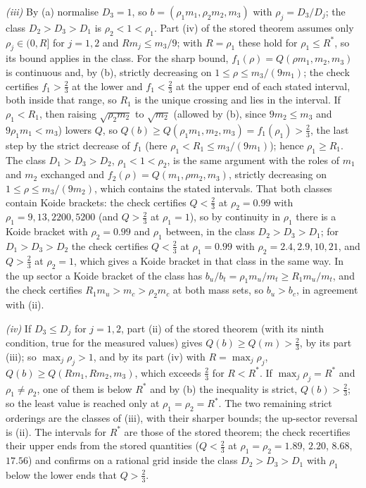 \emph{(iii)} By (a) normalise $D_{3} = 1$, so $b = (\rho_{1}m_{1}, \rho_{2}m_{2}, m_{3})$ with $\rho_{j} = D_{3}/D_{j}$; the class $D_{2} > D_{3} > D_{1}$ is $\rho_{2} < 1 < \rho_{1}$. Part (iv) of the stored theorem assumes only $\rho_{j} \in (0, R]$ for $j = 1, 2$ and $Rm_{j} \le m_{3}/9$; with $R = \rho_{1}$ these hold for $\rho_{1} \le R^{*}$, so its bound applies in the class. For the sharp bound, $f_{1}(\rho) = Q(\rho m_{1}, m_{2}, m_{3})$ is continuous and, by (b), strictly decreasing on $1 \le \rho \le m_{3}/(9m_{1})$; the check certifies $f_{1} > \tfrac23$ at the lower and $f_{1} < \tfrac23$ at the upper end of each stated interval, both inside that range, so $R_{1}$ is the unique crossing and lies in the interval. If $\rho_{1} < R_{1}$, then raising $\sqrt{\rho_{2}m_{2}}$ to $\sqrt{m_{2}}$ (allowed by (b), since $9m_{2} \le m_{3}$ and $9\rho_{1}m_{1} < m_{3}$) lowers $Q$, so $Q(b) \ge Q(\rho_{1}m_{1}, m_{2}, m_{3}) = f_{1}(\rho_{1}) > \tfrac23$, the last step by the strict decrease of $f_{1}$ (here $\rho_{1} < R_{1} \le m_{3}/(9m_{1})$); hence $\rho_{1} \ge R_{1}$. The class $D_{1} > D_{3} > D_{2}$, $\rho_{1} < 1 < \rho_{2}$, is the same argument with the roles of $m_{1}$ and $m_{2}$ exchanged and $f_{2}(\rho) = Q(m_{1}, \rho m_{2}, m_{3})$, strictly decreasing on $1 \le \rho \le m_{3}/(9m_{2})$, which contains the stated intervals. That both classes contain Koide brackets: the check certifies $Q < \tfrac23$ at $\rho_{2} = 0.99$ with $\rho_{1} = 9, 13, 2200, 5200$ (and $Q > \tfrac23$ at $\rho_{1} = 1$), so by continuity in $\rho_{1}$ there is a Koide bracket with $\rho_{2} = 0.99$ and $\rho_{1}$ between, in the class $D_{2} > D_{3} > D_{1}$; for $D_{1} > D_{3} > D_{2}$ the check certifies $Q < \tfrac23$ at $\rho_{1} = 0.99$ with $\rho_{2} = 2.4, 2.9, 10, 21$, and $Q > \tfrac23$ at $\rho_{2} = 1$, which gives a Koide bracket in that class in the same way. In the up sector a Koide bracket of the class has $b_{u}/b_{t} = \rho_{1}m_{u}/m_{t} \ge R_{1}m_{u}/m_{t}$, and the check certifies $R_{1}m_{u} > m_{c} > \rho_{2}m_{c}$ at both mass sets, so $b_{u} > b_{c}$, in agreement with (ii).

\emph{(iv)} If $D_{3} \le D_{j}$ for $j = 1, 2$, part (ii) of the stored theorem (with its ninth condition, true for the measured values) gives $Q(b) \ge Q(m) > \tfrac23$, by its part (iii); so $\max_{j}\rho_{j} > 1$, and by its part (iv) with $R = \max_{j}\rho_{j}$, $Q(b) \ge Q(Rm_{1}, Rm_{2}, m_{3})$, which exceeds $\tfrac23$ for $R < R^{*}$. If $\max_{j}\rho_{j} = R^{*}$ and $\rho_{1} \ne \rho_{2}$, one of them is below $R^{*}$ and by (b) the inequality is strict, $Q(b) > \tfrac23$; so the least value is reached only at $\rho_{1} = \rho_{2} = R^{*}$. The two remaining strict orderings are the classes of (iii), with their sharper bounds; the up-sector reversal is (ii). The intervals for $R^{*}$ are those of the stored theorem; the check recertifies their upper ends from the stored quantities ($Q < \tfrac23$ at $\rho_{1} = \rho_{2} = 1.89$, $2.20$, $8.68$, $17.56$) and confirms on a rational grid inside the class $D_{2} > D_{3} > D_{1}$ with $\rho_{1}$ below the lower ends that $Q > \tfrac23$.
